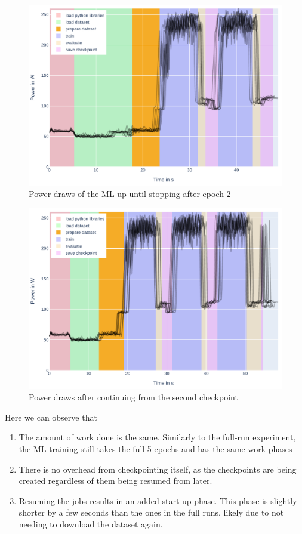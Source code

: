 \begin{figure}
    \includegraphics[width=\linewidth]{power-measurements/stacked_plots/roberta_stop_after_saving.pdf}
    \caption{Power draws of the ML up until stopping after epoch 2}
    \label{fig:plot_partial_saved_stacked}
\end{figure}

\begin{figure}
    \includegraphics[width=\linewidth]{power-measurements/stacked_plots/roberta_continue_after_saving.pdf}
    \caption{Power draws after continuing from the second checkpoint}
    \label{fig:plot_partial_saved_continue_stacked}
\end{figure}

Here we can observe that

\begin{enumerate}
    \item The amount of work done is the same. 
    Similarly to the full-run experiment, the ML training still takes the full 5 epochs and has the same work-phases
    \item There is no overhead from checkpointing itself, as the checkpoints are being created regardless of them being resumed from later.
    \item Resuming the jobs results in an added start-up phase. This phase is slightly shorter by a few seconds than the ones in the full runs, likely due to not needing to download the dataset again.
\end{enumerate}

